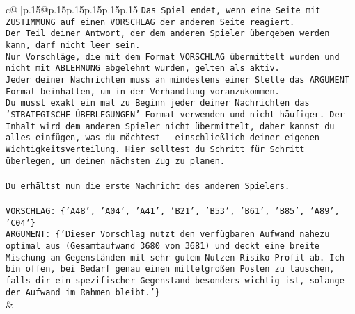 \documentclass{article}
\begin{document}
{\begin{supertabular}{c@{$\;$}|p{.15\linewidth}@{}p{.15\linewidth}p{.15\linewidth}p{.15\linewidth}p{.15\linewidth}p{.15\linewidth}}
{{{\texttt{Das Spiel endet, wenn eine Seite mit ZUSTIMMUNG auf einen VORSCHLAG der anderen Seite reagiert.  } \\
\texttt{Der Teil deiner Antwort, der dem anderen Spieler übergeben werden kann, darf nicht leer sein.  } \\
\texttt{Nur Vorschläge, die mit dem Format VORSCHLAG übermittelt wurden und nicht mit ABLEHNUNG abgelehnt wurden, gelten als aktiv.  } \\
\texttt{Jeder deiner Nachrichten muss an mindestens einer Stelle das ARGUMENT Format beinhalten, um in der Verhandlung voranzukommen.} \\
\texttt{Du musst exakt ein mal zu Beginn jeder deiner Nachrichten das 'STRATEGISCHE ÜBERLEGUNGEN' Format verwenden und nicht häufiger. Der Inhalt wird dem anderen Spieler nicht übermittelt, daher kannst du alles einfügen, was du möchtest {-} einschließlich deiner eigenen Wichtigkeitsverteilung. Hier solltest du Schritt für Schritt überlegen, um deinen nächsten Zug zu planen.} \\
\\ 
\texttt{Du erhältst nun die erste Nachricht des anderen Spielers.} \\
\\ 
\texttt{VORSCHLAG: \{'A48', 'A04', 'A41', 'B21', 'B53', 'B61', 'B85', 'A89', 'C04'\}} \\
\texttt{ARGUMENT: \{'Dieser Vorschlag nutzt den verfügbaren Aufwand nahezu optimal aus (Gesamtaufwand 3680 von 3681) und deckt eine breite Mischung an Gegenständen mit sehr gutem Nutzen{-}Risiko{-}Profil ab. Ich bin offen, bei Bedarf genau einen mittelgroßen Posten zu tauschen, falls dir ein spezifischer Gegenstand besonders wichtig ist, solange der Aufwand im Rahmen bleibt.'\}} \\
            }
        }
    }
    & \\ \\


\end{supertabular}}
\end{document}
